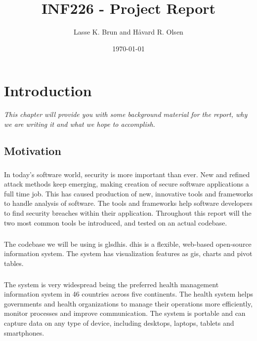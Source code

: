 \documentclass[11pt,english,a4paper]{report}
\title{INF226 - Project Report}
\date{\today}
\author{Lasse K. Brun and Håvard R. Olsen}
\begin{document}
\maketitle

\tableofcontents
\newpage

\printglossaries
\newpage


\chapter{Introduction}
\textit{This chapter will provide you with some background material for the report, why we are writing it and what we hope to accomplish.}

\section{Motivation}
\paragraph{}
In today's software world, security is more important than ever. 
New and refined attack methods keep emerging, making creation of secure software applications a full time job. 
This has caused production of new, innovative tools and frameworks to handle analysis of software. 
The tools and frameworks help software developers to find security breaches within their application. 
Throughout this report will the two most common tools be introduced, and tested on an actual codebase.

\paragraph{}
The codebase we will be using is gls{dhis}. \gls{dhis} is a flexible, web-based open-source information system. 
The system has visualization features as \gls{gis}, charts and pivot tables. 

\paragraph{}
The system is very widespread being the preferred health management information system in 46 countries across five continents. 
The health system helps governments and health organizations to manage their operations more efficiently, monitor processes and improve communication. 
The system is portable and can capture data on any type of device, including desktops, laptops, tablets and smartphones. 
\end{document}
